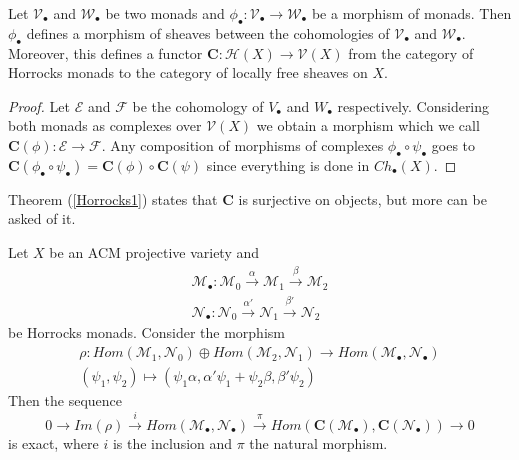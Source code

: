 \documentclass[
	oldfontcommands,
	sumario=abnt-6027-2012,
	12pt,			%
	openright,		%
	oneside,		%
	a4paper,		%
	english,		%
	brazil			%
	]{imecc-unicamp}
\begin{document}
\begin{remark}
Let $\mathcal{V}_\bullet$ and $\mathcal{W}_\bullet$ be two monads and $\phi_\bullet : \mathcal{V}_\bullet \to \mathcal{W}_\bullet$ be a morphism of monads. Then $\phi_\bullet$ defines a morphism of sheaves between the cohomologies of $\mathcal{V}_\bullet$ and $\mathcal{W}_\bullet$. \\
Moreover, this defines a functor $\textbf{C}:\mathcal{H}(X) \to \mathcal{V}(X)$ from the category of Horrocks monads to the category of locally free sheaves on $X$.
\end{remark}
\begin{proof}
Let $\mathcal{E}$ and $\mathcal{F}$ be the cohomology of $V_\bullet$ and $W_\bullet$ respectively. Considering both monads as complexes over $\mathcal{V}(X)$ we obtain a morphism which we call $\textbf{C}(\phi):\mathcal{E} \to \mathcal{F}$. Any composition of morphisms of complexes $\phi_\bullet \circ \psi_\bullet$ goes to $\textbf{C}(\phi_\bullet \circ \psi_\bullet)=\textbf{C}(\phi)\circ \textbf{C}(\psi)$ since everything is done in $Ch_\bullet(X)$.
\end{proof}
Theorem (\ref{Horrocks1}) states that $\textbf{C}$ is surjective on objects, but more can be asked of it.
\begin{theorem}\cite[Jardim \& Martins, Theorem 2.5]{jardim2}\label{Horrocks2}
Let $X$ be an ACM projective variety and
\begin{align}
\mathcal{M}_\bullet : \mathcal{M}_0 \overset{\alpha}{\to} \mathcal{M}_1 \overset{\beta}{\to} \mathcal{M}_2  \\
\mathcal{N}_\bullet : \mathcal{N}_0 \overset{\alpha'}{\to} \mathcal{N}_1 \overset{\beta'}{\to} \mathcal{N}_2
\end{align}
be Horrocks monads. Consider the morphism
\begin{align*}
\rho : Hom(\mathcal{M}_1,\mathcal{N}_0) \oplus Hom(\mathcal{M}_2,\mathcal{N}_1) \to Hom(\mathcal{M}_\bullet,\mathcal{N}_\bullet) \\
(\psi_1,\psi_2) \mapsto (\psi_1 \alpha, \alpha' \psi_1 + \psi_2 \beta, \beta' \psi_2)
\end{align*}
Then the sequence
\begin{equation}
0 \to Im (\rho) \overset{i}{\to} Hom(\mathcal{M}_\bullet, \mathcal{N}_\bullet) \overset{\pi}{\to} Hom(\textbf{C}(\mathcal{M}_\bullet), \textbf{C}(\mathcal{N}_\bullet)) \to 0
\end{equation}
is exact, where $i$ is the inclusion and $\pi$ the natural morphism.
\end{theorem}
\end{document}
